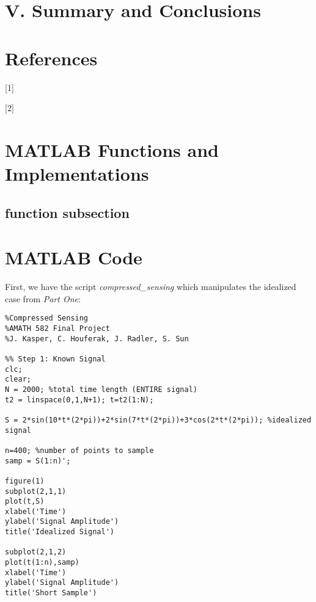 \documentclass[11pt]{article}
\begin{document}
\section*{V.	Summary and Conclusions} %


\pagebreak
\section*{References}
[1]

[2]


\pagebreak

\begin{appendices}

\section{MATLAB Functions and Implementations}

\subsection*{function subsection}

\section{MATLAB Code}
First, we have the script \emph{compressed\_sensing} which manipulates the idealized case from \emph{Part One}:\\
\begin{verbatim}
%Compressed Sensing
%AMATH 582 Final Project
%J. Kasper, C. Houferak, J. Radler, S. Sun

%% Step 1: Known Signal
clc;
clear;
N = 2000; %total time length (ENTIRE signal)
t2 = linspace(0,1,N+1); t=t2(1:N);

S = 2*sin(10*t*(2*pi))+2*sin(7*t*(2*pi))+3*cos(2*t*(2*pi)); %idealized signal

n=400; %number of points to sample
samp = S(1:n)';

figure(1)
subplot(2,1,1)
plot(t,S)
xlabel('Time')
ylabel('Signal Amplitude')
title('Idealized Signal')

subplot(2,1,2)
plot(t(1:n),samp)
xlabel('Time')
ylabel('Signal Amplitude')
title('Short Sample')


\end{verbatim}
\end{appendices}
\end{document}
